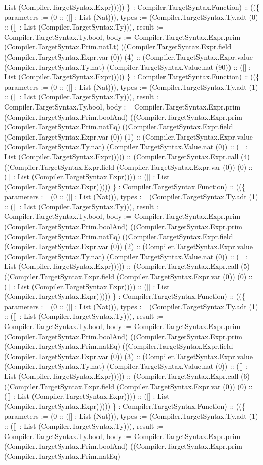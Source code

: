 \documentclass[11pt]{article}
\begin{document}
List (Compiler.TargetSyntax.Expr))))) \} : Compiler.TargetSyntax.Function) :: ((\{ parameters := (0 :: ([] : List (Nat))), types := (Compiler.TargetSyntax.Ty.adt (0) :: ([] : List (Compiler.TargetSyntax.Ty))), result := Compiler.TargetSyntax.Ty.bool, body := Compiler.TargetSyntax.Expr.prim (Compiler.TargetSyntax.Prim.natLt) ((Compiler.TargetSyntax.Expr.field (Compiler.TargetSyntax.Expr.var (0)) (4) :: (Compiler.TargetSyntax.Expr.value (Compiler.TargetSyntax.Ty.nat) (Compiler.TargetSyntax.Value.nat (90)) :: ([] : List (Compiler.TargetSyntax.Expr))))) \} : Compiler.TargetSyntax.Function) :: ((\{ parameters := (0 :: ([] : List (Nat))), types := (Compiler.TargetSyntax.Ty.adt (1) :: ([] : List (Compiler.TargetSyntax.Ty))), result := Compiler.TargetSyntax.Ty.bool, body := Compiler.TargetSyntax.Expr.prim (Compiler.TargetSyntax.Prim.boolAnd) ((Compiler.TargetSyntax.Expr.prim (Compiler.TargetSyntax.Prim.natEq) ((Compiler.TargetSyntax.Expr.field (Compiler.TargetSyntax.Expr.var (0)) (1) :: (Compiler.TargetSyntax.Expr.value (Compiler.TargetSyntax.Ty.nat) (Compiler.TargetSyntax.Value.nat (0)) :: ([] : List (Compiler.TargetSyntax.Expr))))) :: (Compiler.TargetSyntax.Expr.call (4) ((Compiler.TargetSyntax.Expr.field (Compiler.TargetSyntax.Expr.var (0)) (0) :: ([] : List (Compiler.TargetSyntax.Expr)))) :: ([] : List (Compiler.TargetSyntax.Expr))))) \} : Compiler.TargetSyntax.Function) :: ((\{ parameters := (0 :: ([] : List (Nat))), types := (Compiler.TargetSyntax.Ty.adt (1) :: ([] : List (Compiler.TargetSyntax.Ty))), result := Compiler.TargetSyntax.Ty.bool, body := Compiler.TargetSyntax.Expr.prim (Compiler.TargetSyntax.Prim.boolAnd) ((Compiler.TargetSyntax.Expr.prim (Compiler.TargetSyntax.Prim.natEq) ((Compiler.TargetSyntax.Expr.field (Compiler.TargetSyntax.Expr.var (0)) (2) :: (Compiler.TargetSyntax.Expr.value (Compiler.TargetSyntax.Ty.nat) (Compiler.TargetSyntax.Value.nat (0)) :: ([] : List (Compiler.TargetSyntax.Expr))))) :: (Compiler.TargetSyntax.Expr.call (5) ((Compiler.TargetSyntax.Expr.field (Compiler.TargetSyntax.Expr.var (0)) (0) :: ([] : List (Compiler.TargetSyntax.Expr)))) :: ([] : List (Compiler.TargetSyntax.Expr))))) \} : Compiler.TargetSyntax.Function) :: ((\{ parameters := (0 :: ([] : List (Nat))), types := (Compiler.TargetSyntax.Ty.adt (1) :: ([] : List (Compiler.TargetSyntax.Ty))), result := Compiler.TargetSyntax.Ty.bool, body := Compiler.TargetSyntax.Expr.prim (Compiler.TargetSyntax.Prim.boolAnd) ((Compiler.TargetSyntax.Expr.prim (Compiler.TargetSyntax.Prim.natEq) ((Compiler.TargetSyntax.Expr.field (Compiler.TargetSyntax.Expr.var (0)) (3) :: (Compiler.TargetSyntax.Expr.value (Compiler.TargetSyntax.Ty.nat) (Compiler.TargetSyntax.Value.nat (0)) :: ([] : List (Compiler.TargetSyntax.Expr))))) :: (Compiler.TargetSyntax.Expr.call (6) ((Compiler.TargetSyntax.Expr.field (Compiler.TargetSyntax.Expr.var (0)) (0) :: ([] : List (Compiler.TargetSyntax.Expr)))) :: ([] : List (Compiler.TargetSyntax.Expr))))) \} : Compiler.TargetSyntax.Function) :: ((\{ parameters := (0 :: ([] : List (Nat))), types := (Compiler.TargetSyntax.Ty.adt (1) :: ([] : List (Compiler.TargetSyntax.Ty))), result := Compiler.TargetSyntax.Ty.bool, body := Compiler.TargetSyntax.Expr.prim (Compiler.TargetSyntax.Prim.boolAnd) ((Compiler.TargetSyntax.Expr.prim (Compiler.TargetSyntax.Prim.natEq) 
\end{document}
